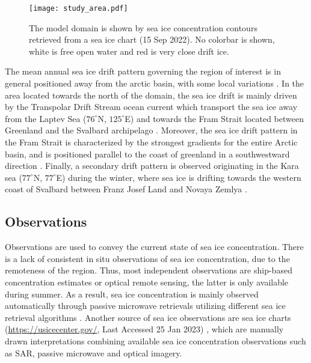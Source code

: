 \documentclass[../main/thesis.tex]{subfiles}
\begin{document}
\begin{figure}
    \centering
    \texttt{[image: study\_area.pdf]}
    \caption{\label{fig:studyarea}The model domain is shown by sea ice concentration contours retrieved from a sea ice chart (15 Sep 2022). No colorbar is shown, white is free open water and red is very close drift ice.}
\end{figure}

The mean annual sea ice drift pattern governing the region of interest is in general positioned away from the arctic basin, with some local variations \citep{Barry1993}. In the area located towards the north of the domain, the sea ice drift is mainly driven by the Transpolar Drift Stream ocean current which transport the sea ice away from the Laptev Sea ($76^\circ$N, $125^\circ$E) and towards the Fram Strait located between Greenland and the Svalbard archipelago \citep{Colony1984}. Moreover, the sea ice drift pattern in the Fram Strait is characterized by the strongest gradients for the entire Arctic basin, and is positioned parallel to the coast of greenland in a southwestward direction \citep{Barry1993}. Finally, a secondary drift pattern is observed originating in the Kara sea ($77^\circ$N, $77^\circ$E) during the winter, where sea ice is drifting towards the western coast of Svalbard between Franz Josef Land and Novaya Zemlya \citep{Kaur2018}.

\subsection{Observations}
Observations are used to convey the current state of sea ice concentration. There is a lack of consistent in situ observations of sea ice concentration, due to the remoteness of the region. Thus, most independent observations are ship-based concentration estimates \citep{Kern2019} or optical remote sensing, the latter is only available during summer. As a result, sea ice concentration is mainly observed automatically through passive microwave retrievals utilizing different sea ice retrieval algorithms \citep{Lavergne2019a, Comiso1997,Spreen2008}. Another source of sea ice observations are sea ice charts (\url{https://usicecenter.gov/}, Last Accessed 25 Jan 2023) \citep{Dinessen2020}, which are manually drawn interpretations combining available sea ice concentration observations such as SAR, passive microwave and optical imagery. 
\end{document}
